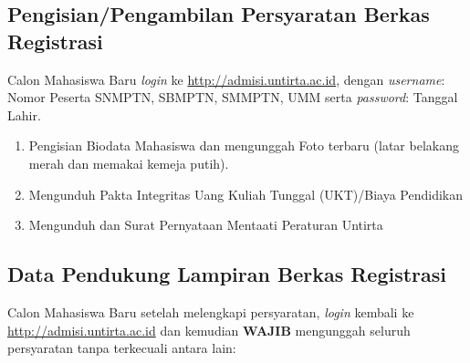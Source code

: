 \documentclass[
]{book}
\providecommand{\tightlist}{%
  \setlength{\itemsep}{0pt}\setlength{\parskip}{0pt}}
\begin{document}
\hypertarget{pengisianpengambilan-persyaratan-berkas-registrasi}{%
\subsection{Pengisian/Pengambilan Persyaratan Berkas Registrasi}\label{pengisianpengambilan-persyaratan-berkas-registrasi}}

Calon Mahasiswa Baru \emph{login} ke \url{http://admisi.untirta.ac.id}, dengan \emph{username}: Nomor Peserta SNMPTN, SBMPTN, SMMPTN, UMM serta \emph{password}: Tanggal Lahir.

\begin{enumerate}
\def\labelenumi{\alph{enumi}.}
\tightlist
\item
  Pengisian Biodata Mahasiswa dan mengunggah Foto terbaru (latar belakang merah dan memakai kemeja putih).
\item
  Mengunduh Pakta Integritas Uang Kuliah Tunggal (UKT)/Biaya Pendidikan
\item
  Mengunduh dan Surat Pernyataan Mentaati Peraturan Untirta
\end{enumerate}

\hypertarget{data-pendukung-lampiran-berkas-registrasi}{%
\subsection{Data Pendukung Lampiran Berkas Registrasi}\label{data-pendukung-lampiran-berkas-registrasi}}

Calon Mahasiswa Baru setelah melengkapi persyaratan, \emph{login} kembali ke \url{http://admisi.untirta.ac.id} dan kemudian \textbf{WAJIB} mengunggah seluruh persyaratan tanpa terkecuali antara lain:
\end{document}
